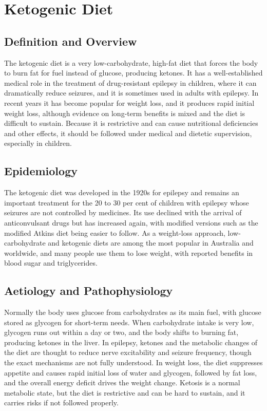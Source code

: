 \chapter{Ketogenic Diet}

\section*{Definition and Overview}
The ketogenic diet is a very low-carbohydrate, high-fat diet that forces the body to burn fat for fuel instead of glucose, producing ketones. It has a well-established medical role in the treatment of drug-resistant epilepsy in children, where it can dramatically reduce seizures, and it is sometimes used in adults with epilepsy. In recent years it has become popular for weight loss, and it produces rapid initial weight loss, although evidence on long-term benefits is mixed and the diet is difficult to sustain. Because it is restrictive and can cause nutritional deficiencies and other effects, it should be followed under medical and dietetic supervision, especially in children.

\section*{Epidemiology}
The ketogenic diet was developed in the 1920s for epilepsy and remains an important treatment for the 20 to 30 per cent of children with epilepsy whose seizures are not controlled by medicines. Its use declined with the arrival of anticonvulsant drugs but has increased again, with modified versions such as the modified Atkins diet being easier to follow. As a weight-loss approach, low-carbohydrate and ketogenic diets are among the most popular in Australia and worldwide, and many people use them to lose weight, with reported benefits in blood sugar and triglycerides.

\section*{Aetiology and Pathophysiology}
Normally the body uses glucose from carbohydrates as its main fuel, with glucose stored as glycogen for short-term needs. When carbohydrate intake is very low, glycogen runs out within a day or two, and the body shifts to burning fat, producing ketones in the liver. In epilepsy, ketones and the metabolic changes of the diet are thought to reduce nerve excitability and seizure frequency, though the exact mechanisms are not fully understood. In weight loss, the diet suppresses appetite and causes rapid initial loss of water and glycogen, followed by fat loss, and the overall energy deficit drives the weight change. Ketosis is a normal metabolic state, but the diet is restrictive and can be hard to sustain, and it carries risks if not followed properly.

